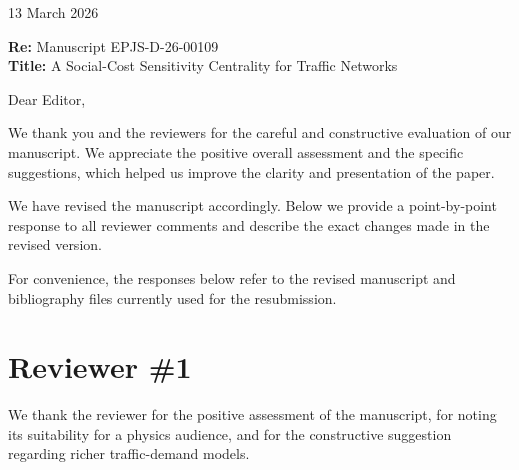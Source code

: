 \documentclass[11pt]{article}
\begin{document}
\begin{flushright}
13 March 2026
\end{flushright}

\noindent\textbf{Re:} Manuscript EPJS-D-26-00109\\
\textbf{Title:} A Social-Cost Sensitivity Centrality for Traffic Networks

\vspace{1em}

\noindent Dear Editor,

We thank you and the reviewers for the careful and constructive evaluation of our manuscript. We appreciate the positive overall assessment and the specific suggestions, which helped us improve the clarity and presentation of the paper.

We have revised the manuscript accordingly. Below we provide a point-by-point response to all reviewer comments and describe the exact changes made in the revised version.

For convenience, the responses below refer to the revised manuscript and bibliography files currently used for the resubmission.

\section*{Reviewer \#1}

We thank the reviewer for the positive assessment of the manuscript, for noting its suitability for a physics audience, and for the constructive suggestion regarding richer traffic-demand models.
\end{document}
